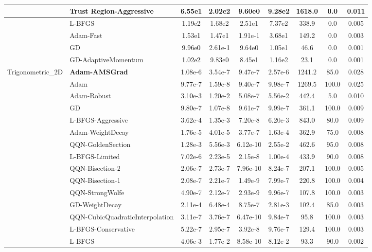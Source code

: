 \documentclass{article}
\begin{document}
\begin{longtable}{|l|l|c|c|c|c|c|c|c|}
\hline
 & Trust Region-Aggressive & 6.55e1 & 2.02e2 & 9.60e0 & 9.28e2 & 1618.0 & 0.0 & 0.011 \\
\hline
 & L-BFGS & 1.19e2 & 1.68e2 & 2.51e1 & 7.37e2 & 338.9 & 0.0 & 0.005 \\
\hline
 & Adam-Fast & 1.53e1 & 1.47e1 & 1.91e-1 & 3.68e1 & 149.2 & 0.0 & 0.003 \\
\hline
 & GD & 9.96e0 & 2.61e-1 & 9.64e0 & 1.05e1 & 46.6 & 0.0 & 0.001 \\
\hline
 & GD-AdaptiveMomentum & 1.02e2 & 9.83e0 & 8.45e1 & 1.16e2 & 23.1 & 0.0 & 0.001 \\
Trigonometric\_2D & \textbf{Adam-AMSGrad} & 1.08e-6 & 3.54e-7 & 9.47e-7 & 2.57e-6 & 1241.2 & 85.0 & 0.028 \\
\hline
 & Adam & 9.77e-7 & 1.59e-8 & 9.40e-7 & 9.98e-7 & 1269.5 & 100.0 & 0.025 \\
\hline
 & Adam-Robust & 3.10e-3 & 1.20e-2 & 5.08e-7 & 5.56e-2 & 442.4 & 5.0 & 0.010 \\
\hline
 & GD & 9.80e-7 & 1.07e-8 & 9.61e-7 & 9.99e-7 & 361.1 & 100.0 & 0.009 \\
\hline
 & L-BFGS-Aggressive & 3.62e-4 & 1.35e-3 & 7.20e-8 & 6.20e-3 & 843.0 & 80.0 & 0.009 \\
\hline
 & Adam-WeightDecay & 1.76e-5 & 4.01e-5 & 3.77e-7 & 1.63e-4 & 362.9 & 75.0 & 0.008 \\
\hline
 & QQN-GoldenSection & 1.28e-3 & 5.56e-3 & 6.12e-10 & 2.55e-2 & 462.6 & 95.0 & 0.008 \\
\hline
 & L-BFGS-Limited & 7.02e-6 & 2.23e-5 & 2.15e-8 & 1.00e-4 & 433.9 & 90.0 & 0.008 \\
\hline
 & QQN-Bisection-2 & 2.06e-7 & 2.73e-7 & 7.96e-10 & 8.24e-7 & 207.1 & 100.0 & 0.005 \\
\hline
 & QQN-Bisection-1 & 2.08e-7 & 2.21e-7 & 1.49e-9 & 7.99e-7 & 220.8 & 100.0 & 0.004 \\
\hline
 & QQN-StrongWolfe & 4.90e-7 & 2.12e-7 & 2.93e-9 & 9.96e-7 & 107.8 & 100.0 & 0.003 \\
\hline
 & GD-WeightDecay & 2.11e-4 & 6.48e-4 & 8.75e-7 & 2.81e-3 & 102.4 & 85.0 & 0.003 \\
\hline
 & QQN-CubicQuadraticInterpolation & 3.11e-7 & 3.76e-7 & 6.47e-10 & 9.84e-7 & 95.8 & 100.0 & 0.003 \\
\hline
 & L-BFGS-Conservative & 5.22e-7 & 2.95e-7 & 3.92e-8 & 9.76e-7 & 129.4 & 100.0 & 0.003 \\
\hline
 & L-BFGS & 4.06e-3 & 1.77e-2 & 8.58e-10 & 8.12e-2 & 93.3 & 90.0 & 0.002 \\

\end{longtable}
\end{document}
